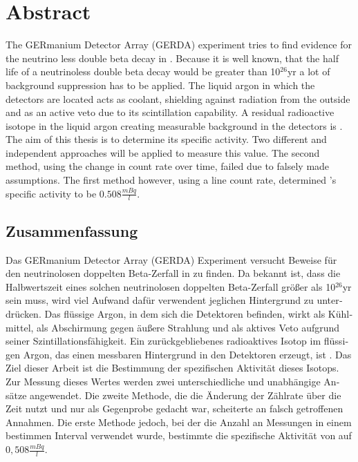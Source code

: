 \documentclass[encoding=utf8,british]{tumphthesis}
\begin{document}



\chapter*{Abstract}
The GERmanium Detector Array (GERDA) experiment tries to find evidence for the neutrino less double beta decay in .
Because it is well known, that the half life of a neutrinoless double beta decay would be greater than 10$^{26}$yr a lot of background suppression has to be applied.
The liquid argon in which the detectors are located acts as coolant, shielding against radiation from the outside and as an active veto due to its scintillation capability.
A residual radioactive isotope in the liquid argon creating measurable background in the detectors is .
The aim of this thesis is to determine its specific activity.
Two different and independent approaches will be applied to measure this value.
The second method, using the change in  count rate over time, failed due to falsely made assumptions.
The first method however, using a line count rate, determined 's specific activity to be $0.508\frac{\unit{mBq}}{\unit{l}}$.

\begin{otherlanguage}{ngerman}
\chapter*{Zusammenfassung}
Das GERmanium Detector Array (GERDA) Experiment versucht Beweise für den neutrinolosen doppelten Beta-Zerfall in  zu finden.
Da bekannt ist, dass die Halbwertszeit eines solchen neutrinolosen doppelten Beta-Zerfall größer als 10$^{26}$yr sein muss, wird viel Aufwand dafür verwendent jeglichen Hintergrund zu unterdrücken.
Das flüssige Argon, in dem sich die Detektoren befinden, wirkt als Kühlmittel, als Abschirmung gegen äußere Strahlung und als aktives Veto aufgrund seiner Szintillationsfähigkeit.
Ein zurückgebliebenes radioaktives Isotop im flüssigen Argon, das einen messbaren Hintergrund in den Detektoren erzeugt, ist .
Das Ziel dieser Arbeit ist die Bestimmung der spezifischen Aktivität dieses Isotops.
Zur Messung dieses Wertes werden zwei unterschiedliche und unabhängige Ansätze angewendet.
Die zweite Methode, die die Änderung der Zählrate über die Zeit nutzt und nur als Gegenprobe gedacht war, scheiterte an falsch getroffenen Annahmen.
Die erste Methode jedoch, bei der die Anzahl an Messungen in einem bestimmen Interval verwendet wurde, bestimmte die spezifische Aktivität von  auf $0,508\frac{mBq} {\unit{l}}$.
\end{otherlanguage}
\end{document}

